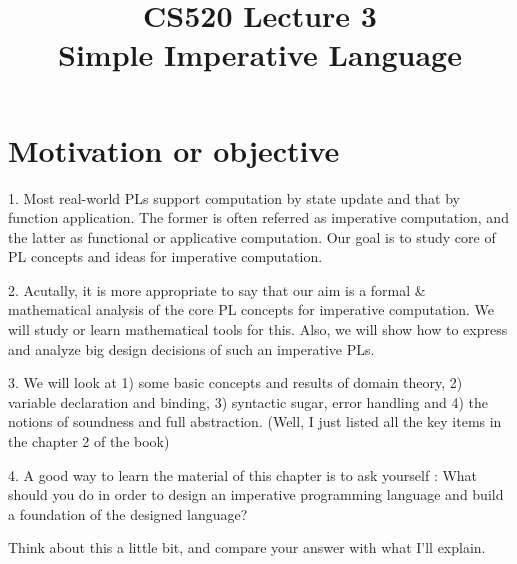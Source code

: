 \documentclass{report}[12pt]
\begin{document}
\setlength\parindent{0pt}

  {\topsep}{\topsep}%
  {\itshape}{}%
  {\bfseries}{}%
  {\newline}{}%

\theoremstyle{break}

\newtheorem{theorem}{Theorem}[section]
\newtheorem{definition}{Definition}
\newtheorem{proposition}{Proposition}
\newtheorem{corollary}{Corollary}
\newtheorem{lemma}{Lemma}
\newtheorem{example}{Example}
\newcommand{\nonterminal}[1]{\langle \text{#1}\rangle}
\newcommand{\rem}[0]{\text{ rem }}
\newcommand{\interp}[1]{\llbracket #1 \rrbracket}
\newcommand{\bbot}[0]{\Perp}
\newcommand{\TODO}[1]{TODO : #1}

\setcounter{chapter}{3}

\title{CS520 Lecture 3\\Simple Imperative Language}
\Large
\maketitle

\section{Motivation or objective}
1. Most real-world PLs support computation by state update and that by function application. The former is often referred as imperative computation, and the latter as functional or applicative computation. Our goal is to study core of PL concepts and ideas for imperative computation.

2. Acutally, it is more appropriate to say that our aim is a formal \& mathematical analysis of the core PL concepts for imperative computation. We will study or learn mathematical tools for this. Also, we will show how to express and analyze big design decisions of such an imperative PLs.

3. We will look at 1) some basic concepts and results of domain theory, 2) variable declaration and binding, 3) syntactic sugar, error handling and 4) the notions of soundness and full abstraction. (Well, I just listed all the key items in the chapter 2 of the book)

4. A good way to learn the material of this chapter is to ask yourself : What should you do in order to design an imperative programming language and build a foundation of the designed language?

Think about this a little bit, and compare your answer with what I'll explain.
\end{document}
